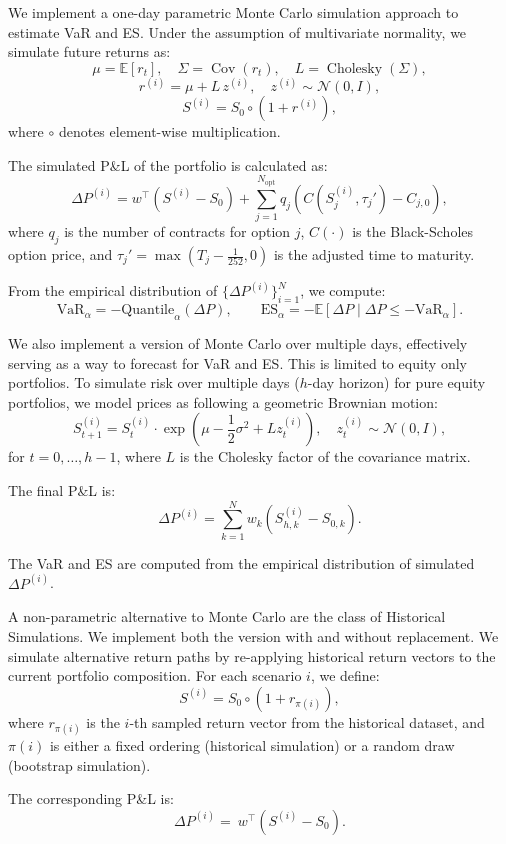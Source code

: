 \documentclass[12pt]{article}
\begin{document}
We implement a one-day parametric Monte Carlo simulation approach to estimate VaR and ES. Under the assumption of multivariate normality, we simulate future returns as:
\[
\mu = \mathbb{E}[r_t], \quad \Sigma = \operatorname{Cov}(r_t), \quad L = \operatorname{Cholesky}(\Sigma),
\]
\[
r^{(i)} = \mu + L\, z^{(i)}, \quad z^{(i)} \sim \mathcal{N}(0, I),
\]
\[
S^{(i)} = S_0 \circ (1 + r^{(i)}),
\]
where $\circ$ denotes element-wise multiplication.

The simulated P\&L of the portfolio is calculated as:
\[
\Delta P^{(i)} = w^\top(S^{(i)} - {S}_0) + \sum_{j=1}^{N_{\mathrm{opt}}} q_j \left(C(S_j^{(i)}, \tau_j') - C_{j,0}\right),
\]
where $q_j$ is the number of contracts for option $j$, $C(\cdot)$ is the Black-Scholes option price, and $\tau_j' = \max(T_j - \frac{1}{252}, 0)$ is the adjusted time to maturity.

From the empirical distribution of $\{\Delta P^{(i)}\}_{i=1}^N$, we compute:
\[
\text{VaR}_\alpha = -\text{Quantile}_\alpha(\Delta P), \qquad
\text{ES}_\alpha = -\mathbb{E}[\Delta P \mid \Delta P \le -\text{VaR}_\alpha].
\]

We also implement a version of Monte Carlo over multiple days, effectively serving as a way to forecast for VaR and ES. This is limited to equity only portfolios.
To simulate risk over multiple days ($h$-day horizon) for pure equity portfolios, we model prices as following a geometric Brownian motion:
\[
S_{t+1}^{(i)} = S_t^{(i)} \cdot \exp\left(\mu - \frac{1}{2} \sigma^2 + L z_t^{(i)}\right), \quad z_t^{(i)} \sim \mathcal{N}(0, I),
\]
for $t = 0, \dots, h-1$, where $L$ is the Cholesky factor of the covariance matrix.

The final P\&L is:
\[
\Delta P^{(i)} = \sum_{k=1}^N w_k (S_{h,k}^{(i)} - S_{0,k}).
\]

The VaR and ES are computed from the empirical distribution of simulated $\Delta P^{(i)}$.


A non-parametric alternative to Monte Carlo are the class of Historical Simulations. We implement both the version with and without replacement.
We simulate alternative return paths by re-applying historical return vectors to the current portfolio composition. For each scenario $i$, we define:
\[
S^{(i)} = S_0 \circ (1 + r_{\pi(i)}),
\]
where $r_{\pi(i)}$ is the $i$-th sampled return vector from the historical dataset, and $\pi(i)$ is either a fixed ordering (historical simulation) or a random draw (bootstrap simulation).

The corresponding P\&L is:
\[
\Delta P^{(i)} = \ w^\top (S^{(i)} - S_0).
\]
\end{document}
